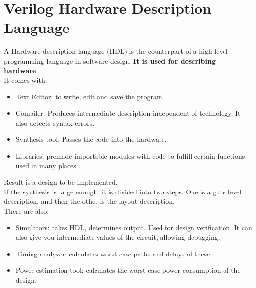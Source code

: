 \documentclass[nobib]{tufte-handout}
\begin{document}
    \section{Verilog Hardware Description Language}
    A Hardware description language (HDL) is the counterpart of a high-level
    programming language in software design. \textbf{It is used for describing
        hardware}.\\ It comes with:\\
    \begin{itemize}
        \item Text Editor: to write, edit and save the program.
        \item Compiler: Produces intermediate description independent of technology. It also
              detects syntax errors.
        \item Synthesis tool: Passes the code into the hardware.
        \item Libraries: premade importable modules with code to fulfill certain functions
              used in many places.
    \end{itemize}
    Result is a design to be implemented.\\
    If the synthesis is large enough, it is divided into two steps. One is a gate level description, and then the other is the layout description.\\
    There are also:
    \begin{itemize}
        \item Simulators: takes HDL, determines output. Used for design verification. It can
              also give you intermediate values of the circuit, allowing debugging.
        \item Timing analyzer: calculates worst case paths and delays of these.
        \item Power estimation tool: calculates the worst case power consumption of the
              design.
    \end{itemize}
\end{document}
